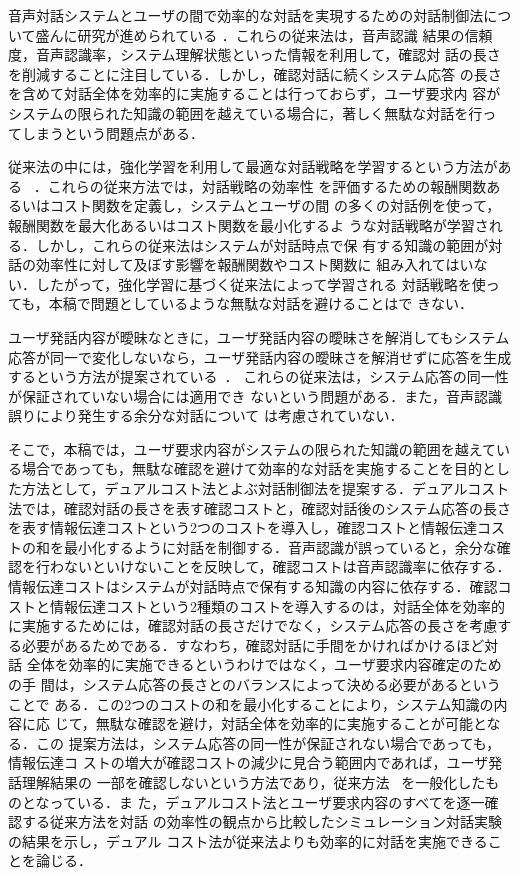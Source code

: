 音声対話システムとユーザの間で効率的な対話を実現するための対話制御法につ
いて盛んに研究が進められている
\cite{Chu:00,LPE:98,Niimi:96,LKSM:00,RPT:00}．これらの従来法は，音声認識
結果の信頼度，音声認識率，システム理解状態といった情報を利用して，確認対
話の長さを削減することに注目している．しかし，確認対話に続くシステム応答
の長さを含めて対話全体を効率的に実施することは行っておらず，ユーザ要求内
容がシステムの限られた知識の範囲を越えている場合に，著しく無駄な対話を行っ
てしまうという問題点がある．

従来法の中には，強化学習を利用して最適な対話戦略を学習するという方法があ
る~ \cite{LPE:98,LKSM:00,RPT:00}．これらの従来方法では，対話戦略の効率性
を評価するための報酬関数あるいはコスト関数を定義し，システムとユーザの間
の多くの対話例を使って，報酬関数を最大化あるいはコスト関数を最小化するよ
うな対話戦略が学習される．しかし，これらの従来法はシステムが対話時点で保
有する知識の範囲が対話の効率性に対して及ぼす影響を報酬関数やコスト関数に
組み入れてはいない．したがって，強化学習に基づく従来法によって学習される
対話戦略を使っても，本稿で問題としているような無駄な対話を避けることはで
きない．

ユーザ発話内容が曖昧なときに，ユーザ発話内容の曖昧さを解消してもシステム
応答が同一で変化しないなら，ユーザ発話内容の曖昧さを解消せずに応答を生成
するという方法が提案されている~\cite{Ardissono:96,RasZuk:94,vBkCoh:91}．
これらの従来法は，システム応答の同一性が保証されていない場合には適用でき
ないという問題がある．また，音声認識誤りにより発生する余分な対話について
は考慮されていない．

そこで，本稿では，ユーザ要求内容がシステムの限られた知識の範囲を越えてい
る場合であっても，無駄な確認を避けて効率的な対話を実施することを目的とし
た方法として，デュアルコスト法とよぶ対話制御法を提案する．デュアルコスト
法では，確認対話の長さを表す確認コストと，確認対話後のシステム応答の長さ
を表す情報伝達コストという2つのコストを導入し，確認コストと情報伝達コス
トの和を最小化するように対話を制御する．音声認識が誤っていると，余分な確
認を行わないといけないことを反映して，確認コストは音声認識率に依存する．
情報伝達コストはシステムが対話時点で保有する知識の内容に依存する．確認コ
ストと情報伝達コストという2種類のコストを導入するのは，対話全体を効率的
に実施するためには，確認対話の長さだけでなく，システム応答の長さを考慮す
る必要があるためである．すなわち，確認対話に手間をかければかけるほど対話
全体を効率的に実施できるというわけではなく，ユーザ要求内容確定のための手
間は，システム応答の長さとのバランスによって決める必要があるということで
ある．この2つのコストの和を最小化することにより，システム知識の内容に応
じて，無駄な確認を避け，対話全体を効率的に実施することが可能となる．この
提案方法は，システム応答の同一性が保証されない場合であっても，情報伝達コ
ストの増大が確認コストの減少に見合う範囲内であれば，ユーザ発話理解結果の
一部を確認しないという方法であり，従来方法~
\cite{Ardissono:96,RasZuk:94,vBkCoh:91}を一般化したものとなっている．ま
た，デュアルコスト法とユーザ要求内容のすべてを逐一確認する従来方法を対話
の効率性の観点から比較したシミュレーション対話実験の結果を示し，デュアル
コスト法が従来法よりも効率的に対話を実施できることを論じる．


